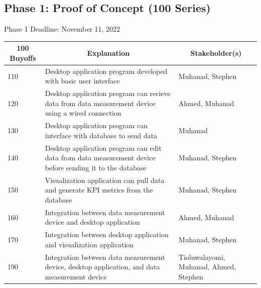 \documentclass[12pt]{article}
\begin{document}
\noindent
\subsection{Phase 1: Proof of Concept (100 Series)}
Phase 1 Deadline: November 11, 2022\\
\begin{table}[H]
  \centering
  \begin{tabular}{|p{2cm}|p{10cm}|p{2cm}|}
  \hline
  \multicolumn{1}{|c|}{\textbf{100 Buyoffs}} & \multicolumn{1}{c|}{\textbf{Explanation}} & \multicolumn{1}{|c|}{\textbf{Stakeholder(s)}}
  \\ \hline
  110
  & Desktop application program developed with basic user interface
  & Muhanad, Stephen
  \newline                                
  
  \\ \hline
  120                              
  & Desktop application program can recieve data from data measurement device using a wired connection
  & Ahmed, Muhanad
  \newline                                

  \\ \hline
  130                          
  & Desktop application program can interface with database to send data
  & Muhanad
  \newline                                

  \\ \hline
  140                                
  & Desktop application program can edit data from data measurement device before sending it to the database
  & Muhanad, Stephen 
  \newline                            

    \\ \hline
  150                                
  & Visualization application can pull data and generate KPI metrics from the database
  & Muhanad, Stephen  
  \newline 

  \\ \hline
  160                                
  & Integration between data measurement device and desktop application
  & Ahmed, Muhanad 
  \newline 

  \\ \hline
  170                                
  & Integration between desktop application and visualization application
  & Muhanad, Stephen  
  \newline 

  \\ \hline
  190                                
  & Integration between data measurement device, desktop application, and data measurement device
  & Tioluwalayomi, Muhanad, Ahmed, Stephen 
  \newline 
  \\ \hline


  \end{tabular}
\end{table}
\end{document}
